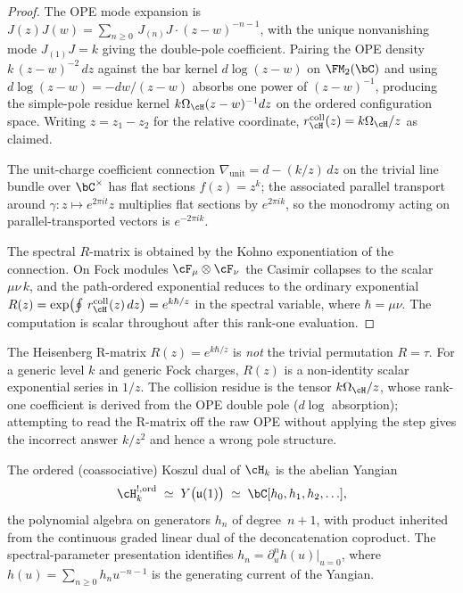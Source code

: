 \begin{proof}
The OPE mode expansion is
$J(z)J(w)=\sum_{n\ge0}\,J_{(n)}J\cdot(z-w)^{-n-1}$,
with the unique nonvanishing mode $J_{(1)}J=k$ giving the
double-pole coefficient. Pairing the OPE density
$k\,(z-w)^{-2}\,dz$ against the bar kernel $d\log(z-w)$ on
$\FM_2(\bC)$ and using $d\log(z-w)=-dw/(z-w)$ absorbs one
power of $(z-w)^{-1}$, producing the simple-pole residue
kernel $k\Omega_{\cH}(z-w)^{-1}dz$ on the ordered configuration space.
Writing $z=z_1-z_2$ for the relative coordinate,
$r^{\mathrm{coll}}_{\cH}(z)=k\Omega_{\cH}/z$ as claimed.

The unit-charge coefficient connection
$\nabla_{\mathrm{unit}} = d - (k/z)\,dz$ on the trivial
line bundle over $\bC^\times$ has flat sections
$f(z) = z^{k}$; the associated parallel transport around
$\gamma\colon z\mapsto e^{2\pi it}z$ multiplies flat
sections by $e^{2\pi ik}$, so the monodromy acting on
parallel-transported vectors is $e^{-2\pi ik}$.

The spectral $R$-matrix is obtained by the Kohno
exponentiation of the connection. On Fock modules
$\cF_\mu\otimes\cF_\nu$ the Casimir collapses to the scalar
$\mu\nu\,k$, and the path-ordered exponential reduces to
the ordinary exponential
$R(z)=\exp\bigl(\oint\,r^{\mathrm{coll}}_{\cH}(z)\,dz\bigr)
=e^{k\hbar/z}$ in the spectral variable, where
$\hbar=\mu\nu$. The computation is scalar throughout
after this rank-one evaluation.
\end{proof}

\begin{remark}
\label{rem:heisenberg-rmatrix-nontrivial}
The Heisenberg R-matrix $R(z)=e^{k\hbar/z}$ is \emph{not}
the trivial permutation $R=\tau$. For a generic level
$k$ and generic Fock charges, $R(z)$ is a non-identity
scalar exponential series in $1/z$. The collision residue
is the tensor $k\Omega_{\cH}/z$, whose rank-one coefficient is derived
from the OPE double pole ($d\log$ absorption); attempting to read the
R-matrix off the raw OPE
without applying the step gives the incorrect answer
$k/z^2$ and hence a wrong pole structure.
\end{remark}

\begin{theorem}
\label{thm:heisenberg-yangian}
The ordered \textup{(}coassociative\textup{)} Koszul
dual of $\cH_k$ is the abelian Yangian
\begin{equation}\label{eq:heisenberg-yangian}
\cH_k^{!,\mathrm{ord}}
\;\simeq\;
Y\bigl(\mathfrak{u}(1)\bigr)
\;\simeq\;
\bC[h_0, h_1, h_2, \ldots],
\end{equation}
the polynomial algebra on generators $h_n$ of degree~$n+1$,
with product inherited from the continuous graded linear dual of the
deconcatenation coproduct. The spectral-parameter
presentation identifies $h_n = \partial_u^n h(u)|_{u=0}$,
where $h(u) = \sum_{n\ge 0} h_n u^{-n-1}$ is the generating
current of the Yangian.
\end{theorem}

